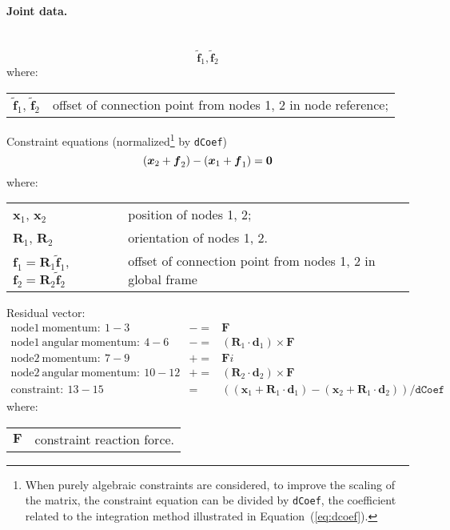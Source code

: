 \documentclass[10pt,dvips,fleqn]{report}
\newcommand{\T}[1]{\boldsymbol{#1}}
\begin{document}
\paragraph{Joint data.} \
\begin{equation}
	\tilde{\T{f}}_1, \tilde{\T{f}}_2
\end{equation}
where:

\noindent
\begin{tabular}{ll}
$\tilde{\T{f}}_1$, $\tilde{\T{f}}_2$ & offset of connection point from nodes 1, 2 in node reference; \\
\end{tabular}

\noindent
Constraint equations (normalized\footnote{When purely algebraic
constraints are considered, to improve the scaling of the matrix,
the constraint equation can be divided by \texttt{dCoef},
the coefficient related to the integration method illustrated 
in Equation~(\ref{eq:dcoef}).
} by \texttt{dCoef})
\begin{equation}
	\plbr{\T{x}_2 + \T{f}_2} - \plbr{\T{x}_1 + \T{f}_1} = \T{0}
\end{equation}
where:

\noindent
\begin{tabular}{ll}
$\T{x}_1$, $\T{x}_2$ & position of nodes 1, 2; \\
$\T{R}_1$, $\T{R}_2$ & orientation of nodes 1, 2.\\
$\T{f}_1 = \T{R}_1 \tilde{\T{f}}_1$, $\T{f}_2 = \T{R}_2 \tilde{\T{f}}_2$ & offset of connection point from nodes 1, 2 in global frame
\end{tabular}

\noindent
Residual vector:
\begin{eqnarray*}
	\mathrm{node1\ momentum}:\ 1-3& -= & \T F \\
	\mathrm{node1\ angular\ momentum}:\ 4-6& -= & 
		(\T R_1\cdot \T d_1) \times \T F \\
	\mathrm{node2\ momentum}:\ 7-9& += & \T Fi \\
	\mathrm{node2\ angular\ momentum}:\ 10-12& += & 
		(\T R_2\cdot \T d_2) \times \T F \\
	\mathrm{constraint}:\ 13-15& = &  ((\T x_1+\T R_1\cdot \T d_1) - 
			(\T x_2+\T R_1\cdot \T d_2))/\texttt{dCoef}
\end{eqnarray*}
where:

\noindent
\begin{tabular}{ll}
$\T{F}$ & constraint reaction force.
\end{tabular}
\end{document}
